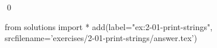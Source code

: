 
\begin{ex}
  \label{ex:2-01-print-strings}
  
  \qed
\end{ex}
\begin{python0}
from solutions import *
add(label="ex:2-01-print-strings",
    srcfilename='exercises/2-01-print-strings/answer.tex')
\end{python0}

